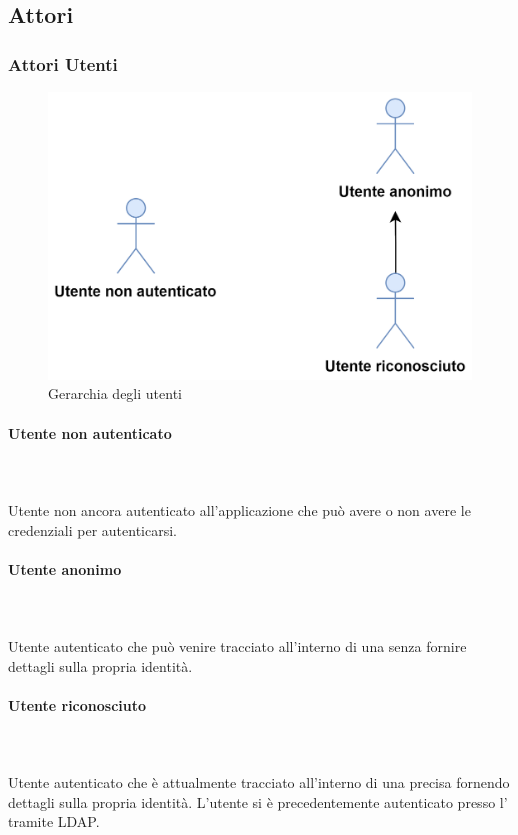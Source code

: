 \subsection{Attori}
\subsubsection{Attori Utenti}

\begin{figure}[h]
  \caption{Gerarchia degli utenti}
  \centering
    \includegraphics[scale=0.8]{Sezioni/UseCase/Immagini/Utenti.png}
\end{figure}

\paragraph{Utente non autenticato}\mbox{}\\ \\
Utente non ancora autenticato all'applicazione che può avere o non avere le credenziali per autenticarsi.
\paragraph{Utente anonimo}\mbox{}\\ \\
Utente autenticato che può venire tracciato all'interno di una  senza fornire dettagli sulla propria identità.
\paragraph{Utente riconosciuto}\mbox{}\\ \\
Utente autenticato che è attualmente tracciato all'interno di una precisa  fornendo dettagli sulla propria identità.
L'utente si è precedentemente autenticato presso l' tramite LDAP.




